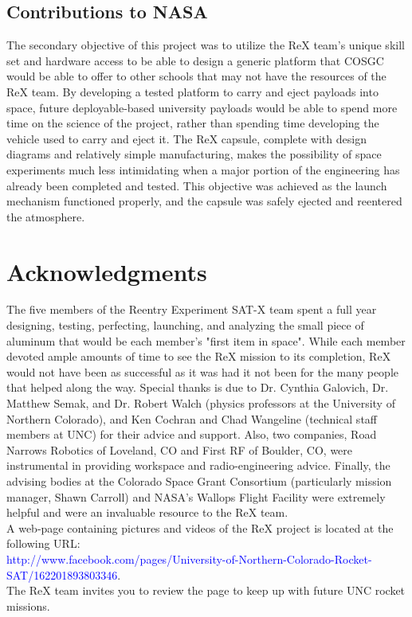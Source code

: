 \documentclass{article}
\begin{document}
	\subsection{Contributions to NASA}
	\begin{doublespace}
		\indent\indent The secondary objective of this project was to utilize the ReX team's unique skill set and hardware access to be able to design a generic platform that COSGC would be able to offer to other schools that may not have the resources of the ReX team. By developing a tested platform to carry and eject payloads into space, future deployable-based university payloads would be able to spend more time on the science of the project, rather than spending time developing the vehicle used to carry and eject it. The ReX capsule, complete with design diagrams and relatively simple manufacturing, makes the possibility of space experiments much less intimidating when a major portion of the engineering has already been completed and tested.  This objective was achieved as the launch mechanism functioned properly, and the capsule was safely ejected and reentered the atmosphere.
	\end{doublespace}

\newpage
\section{Acknowledgments}
	\begin{doublespace}
		\indent\indent The five members of the Reentry Experiment SAT-X team spent a full year designing, testing, perfecting, launching, and analyzing the small piece of aluminum that would be each member's "first item in space". While each member devoted ample amounts of time to see the ReX mission to its completion, ReX would not have been as successful as it was had it not been for the many people that helped along the way. Special thanks is due to Dr. Cynthia Galovich, Dr. Matthew Semak, and Dr. Robert Walch (physics professors at the University of Northern Colorado), and Ken Cochran and Chad Wangeline (technical staff members at UNC) for their advice and support. Also, two companies, Road Narrows Robotics of Loveland, CO and First RF of Boulder, CO, were instrumental in providing workspace and radio-engineering advice. Finally, the advising bodies at the Colorado Space Grant Consortium (particularly mission manager, Shawn Carroll) and NASA's Wallops Flight Facility were extremely helpful and were an invaluable resource to the ReX team.\\
		\indent A web-page containing pictures and videos of the ReX project is located at the following URL:\\ \textcolor{blue}{http://www.facebook.com/pages/University-of-Northern-Colorado-Rocket-SAT/162201893803346}.\\ The ReX team invites you to review the page to keep up with future UNC rocket missions.
	\end{doublespace}
\end{document}
